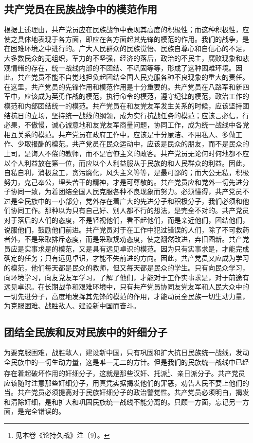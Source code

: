 \documentclass[cn,11pt,chinese]{elegantbook}
\def\myformat#1{\hfil\hfil #1}
\begin{document}
\subsection*{\myformat{共产党员在民族战争中的模范作用}}
根据上述理由，共产党员应在民族战争中表现其高度的积极性；而这种积极性，应使之具体地表现于各方面，即应在各方面起其先锋的模范的作用。我们的战争，是在困难环境之中进行的。广大人民群众的民族觉悟、民族自尊心和自信心的不足，大多数民众的无组织，军力的不坚强，经济的落后，政治的不民主，腐败现象和悲观情绪的存在，统一战线内部的不团结、不巩固等等，形成了这种困难环境。因此，共产党员不能不自觉地担负起团结全国人民克服各种不良现象的重大的责任。在这里，共产党员的先锋作用和模范作用是十分重要的。共产党员在八路军和新四军中，应该成为英勇作战的模范，执行命令的模范，遵守纪律的模范，政治工作的模范和内部团结统一的模范。共产党员在和友党友军发生关系的时候，应该坚持团结抗日的立场，坚持统一战线的纲领，成为实行抗战任务的模范；应该言必信，行必果，不傲慢，诚心诚意地和友党友军商量问题，协同工作，成为统一战线中各党相互关系的模范。共产党员在政府工作中，应该是十分廉洁、不用私人、多做工作、少取报酬的模范。共产党员在民众运动中，应该是民众的朋友，而不是民众的上司，是诲人不倦的教师，而不是官僚主义的政客。共产党员无论何时何地都不应以个人利益放在第一位，而应以个人利益服从于民族的和人民群众的利益。因此，自私自利，消极怠工，贪污腐化，风头主义等等，是最可鄙的；而大公无私，积极努力，克己奉公，埋头苦干的精神，才是可尊敬的。共产党员应和党外一切先进分子协同一致，为着团结全国人民克服各种不良现象而努力。必须懂得，共产党员不过是全民族中的一小部分，党外存在着广大的先进分子和积极分子，我们必须和他们协同工作。那种以为只有自己好、别人都不行的想法，是完全不对的。共产党员对于落后的人们的态度，不是轻视他们，看不起他们，而是亲近他们，团结他们，说服他们，鼓励他们前进。共产党员对于在工作中犯过错误的人们，除了不可救药者外，不是采取排斥态度，而是采取规劝态度，使之翻然改进，弃旧图新。共产党员应是实事求是的模范，又是具有远见卓识的模范。因为只有实事求是，才能完成确定的任务；只有远见卓识，才能不失前进的方向。因此，共产党员又应成为学习的模范，他们每天都是民众的教师，但又每天都是民众的学生。只有向民众学习，向环境学习，向友党友军学习，了解了他们，才能对于工作实事求是，对于前途有远见卓识。在长期战争和艰难环境中，只有共产党员协同友党友军和人民大众中的一切先进分子，高度地发挥其先锋的模范的作用，才能动员全民族一切生动力量，为克服困难、战胜敌人、建设新中国而奋斗。\\
\subsection*{\myformat{团结全民族和反对民族中的奸细分子}}
为要克服困难，战胜敌人，建设新中国，只有巩固和扩大抗日民族统一战线，发动全民族中的一切生动力量，这是唯一无二的方针。但是我们的民族统一战线中已经存在着起破坏作用的奸细分子，这就是那些汉奸、托派\footnote[2]{ 见本卷《论持久战》注〔9〕。}、亲日派分子。共产党员应该随时注意那些奸细分子，用真凭实据揭发他们的罪恶，劝告人民不要上他们的当。共产党员必须提高对于民族奸细分子的政治警觉性。共产党员必须明白，揭发和清除奸细，是和扩大和巩固民族统一战线不能分离的。只顾一方面，忘记另一方面，是完全错误的。\\
\end{document}
